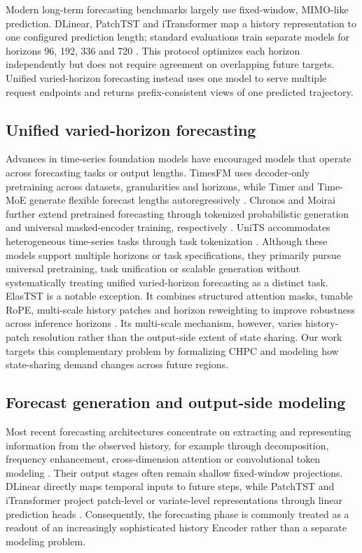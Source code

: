 \documentclass[final,3p,times]{elsarticle}
\newif\ifshowrevisions
\newcommand{\rev}[1]{\ifshowrevisions\textcolor{revisionblue}{#1}\else#1\fi}
\begin{document}
Modern long-term forecasting benchmarks largely use fixed-window, MIMO-like prediction. DLinear, PatchTST and iTransformer map a history representation to one configured prediction length; standard evaluations train separate models for horizons 96, 192, 336 and 720 \citep{zeng2023dlinear,nie2023patchtst,liu2024itransformer}. This protocol optimizes each horizon independently but does not require agreement on overlapping future targets. \rev{Unified varied-horizon forecasting instead uses one model to serve multiple request endpoints and returns prefix-consistent views of one predicted trajectory.}

\subsection{Unified varied-horizon forecasting}


Advances in time-series foundation models have encouraged models that operate across forecasting tasks or output lengths. TimesFM uses decoder-only pretraining across datasets, granularities and horizons, while Timer and Time-MoE generate flexible forecast lengths autoregressively \citep{das2024timesfm,liu2024timer,shi2025timemoe}. Chronos and Moirai further extend pretrained forecasting through tokenized probabilistic generation and universal masked-encoder training, respectively \citep{ansari2024chronos,woo2024moirai}. UniTS accommodates heterogeneous time-series tasks through task tokenization \citep{gao2024units}. Although these models support multiple horizons or task specifications, they primarily pursue universal pretraining, task unification or scalable generation \rev{without systematically treating unified varied-horizon forecasting as a distinct task}. ElasTST is a notable exception. It combines structured attention masks, tunable RoPE, multi-scale history patches and horizon reweighting to improve robustness across inference horizons \citep{zhang2024elastst}. Its multi-scale mechanism, however, varies history-patch resolution rather than the output-side extent of state sharing. Our work targets this complementary problem by formalizing CHPC and modeling how state-sharing demand changes across future regions.

\subsection{Forecast generation and output-side modeling}


Most recent forecasting architectures concentrate on extracting and representing information from the observed history, for example through decomposition, frequency enhancement, cross-dimension attention or convolutional token modeling \citep{wu2021autoformer,zhou2022fedformer,liu2022nonstationary,zhang2023crossformer,luo2024moderntcn}. Their output stages often remain shallow fixed-window projections. DLinear directly maps temporal inputs to future steps, while PatchTST and iTransformer project patch-level or variate-level representations through linear prediction heads \citep{zeng2023dlinear,nie2023patchtst,liu2024itransformer}. Consequently, the forecasting phase is commonly treated as a readout of an increasingly sophisticated history Encoder rather than a separate modeling problem.
\end{document}

